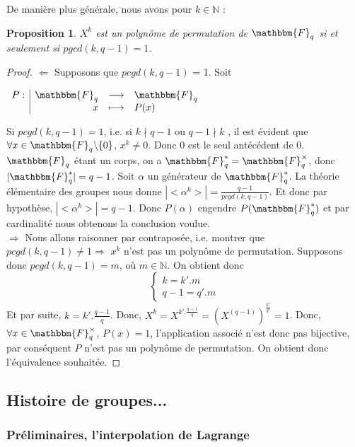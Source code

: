 \documentclass[12pt]{article}
\newcommand{\F}{\mathbbm{F}}
\newcommand{\Fq}{\mathbbm{F}_q}
\newtheorem{prop}{Proposition}
\theoremstyle{definition}
\begin{document}
De manière plus générale, nous avons pour $k \in \mathds{N}$ :

\begin{prop}
$X^k$ est un polynôme de permutation de $\Fq$ si et seulement si $pgcd(k, q-1) = 1$.
\end{prop}

\begin{proof}
$\Leftarrow$ Supposons que $pcgd(k,q-1)$ = 1.
Soit
\begin{center}
$
\begin{array}{l|rcl}
\displaystyle
P : & \F _q & \longrightarrow & \F _q \\
    & x & \longmapsto & P(x)
\end{array}
$
\end{center}
Si $pcgd(k,q-1)=1$, i.e. si $k \nmid q-1$ ou $q-1 \nmid k$ , il est évident que $\forall x \in \Fq \backslash\{0\}$, $x^k \neq 0$. Donc $0$ est le seul antécédent de $0$.
$\Fq$ étant un corps, on a $\Fq^* = \Fq^{\times}$, donc $|\Fq^*| = q-1$. Soit $\alpha$ un générateur de $\Fq^*$. La théorie élémentaire des groupes nous donne $|<\alpha^k>| = \frac{q-1}{pcgd(k,q-1)}$. Et donc par hypothèse, $|<\alpha^k>| =  q-1$.  Donc $P(\alpha)$ engendre $P(\Fq^*)$ et par cardinalité nous obtenons la conclusion voulue.\newline \\
$\Rightarrow$ Nous allons raisonner par contraposée, i.e. montrer que $pcgd(k,q-1) \ne 1 \Rightarrow$ $x^k$ n'est pas un polynôme de permutation.\newline
Supposons donc $pcgd(k,q-1) = m$, où $m \in \mathds{N}$. On obtient donc 
$$
\left\{
    \begin{array}{ll}
        k = k'.m \\
        q-1 = q'.m
    \end{array}
\right.
$$
Et par suite, $k  =k'.\frac{q-1}{q}$.\newline
Donc, $X^k = X^{k'.\frac{q-1}{q}} = (X^{(q-1)})^{\frac{k'}{q'}} = 1$. Donc, $\forall x \in \Fq^{\times}$, $P(x) = 1$, l'application associé n'est donc pas bijective, par conséquent $P$ n'est pas un polynôme de permutation. \newline
On obtient donc l'équivalence souhaitée.
\end{proof}

\subsection{Histoire de groupes...}
\subsubsection{Préliminaires, l'interpolation de Lagrange}
\end{document}

